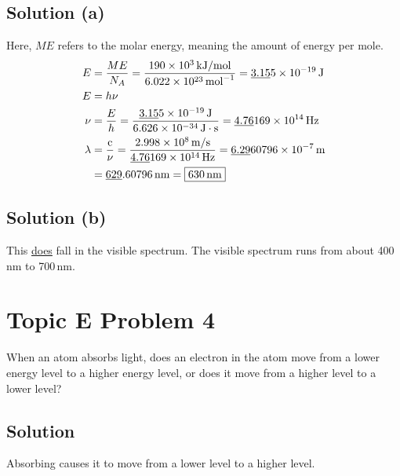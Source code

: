 \documentclass[10pt]{article}
\newcommand{\E}[1]{\times 10^{#1}}
\newcommand{\U}[1]{\underline{#1}}
\begin{document}
        \subsection{Solution (a)}
            Here, $ME$ refers to the molar energy, meaning the amount of energy per mole.
            \begin{align}
                E   &=  \frac{ME}{N_A}
                    =   \frac{190\E{3}\,\unit{\kilo\joule/\mole}}{6.022\E{23}\,\unit{\mole^{-1}}}
                    =   \U{3.15}5\E{-19}\,\unit{\joule}\\
                E   &=  h\nu\\
                \nu &=  \frac{E}{h}
                    =   \frac{\U{3.15}5\E{-19}\,\unit{\joule}}{6.626\E{-34}\,\unit{\joule\cdot\second}}
                    =   \U{4.76}169\E{14}\,\unit{\hertz}\\
                \lambda &=  \frac{\rm c}{\nu}
                    =   \frac{2.998\E{8}\,\unit{\meter/\second}}{\U{4.76}169\E{14}\,\unit{\hertz}}
                    =   \U{6.29}60796\E{-7}\,\unit{\meter}\\
                    &=  \U{629}.60796\,\unit{\nano\meter}
                    =   \boxed{630\,\unit{\nano\meter}}
            \end{align}
        
        \subsection{Solution (b)}
            This \U{does} fall in the visible spectrum.
            The visible spectrum runs from about 400\,\unit{\nano\meter} to 700\,\unit{\nano\meter}.

    \section{Topic E Problem 4}
        When an atom absorbs light, does an electron in the atom move from a lower energy level to a higher energy level, or does it move from a higher level to a lower level?

        \subsection{Solution}
        Absorbing causes it to move from a lower level to a higher level. 


    \pagebreak
\end{document}
